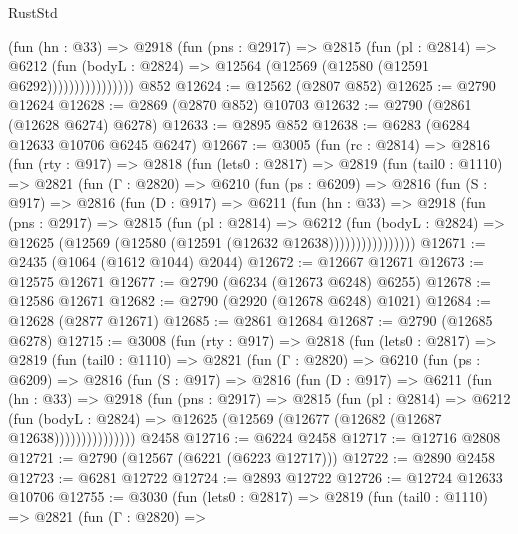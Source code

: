 \begin{lexlean}{RustStd}
\begin{coremodule}
{\begin{coremodule}
{{{{{{{{{{{{{{{{{{{{{{{{{{                      (fun (hn : @33) =>
                      @2918
                        (fun (pns : @2917) =>
                        @2815
                          (fun (pl : @2814) =>
                          @6212
                            (fun (bodyL : @2824) =>
                            @12564 (@12569 (@12580 (@12591 @6292))))))))))))))))
    @852
@12624 := @12562 (@2807 @852)
@12625 := @2790 @12624
@12628 := @2869 (@2870 @852) @10703
@12632 := @2790 (@2861 (@12628 @6274) @6278)
@12633 := @2895 @852
@12638 := @6283 (@6284 @12633 @10706 @6245 @6247)
@12667 := @3005
    (fun (rc : @2814) =>
    @2816
      (fun (rty : @917) =>
      @2818
        (fun (lets0 : @2817) =>
        @2819
          (fun (tail0 : @1110) =>
          @2821
            (fun (Γ : @2820) =>
            @6210
              (fun (ps : @6209) =>
              @2816
                (fun (S : @917) =>
                @2816
                  (fun (D : @917) =>
                  @6211
                    (fun (hn : @33) =>
                    @2918
                      (fun (pns : @2917) =>
                      @2815
                        (fun (pl : @2814) =>
                        @6212
                          (fun (bodyL : @2824) =>
                          @12625 (@12569 (@12580 (@12591 (@12632 @12638))))))))))))))))
@12671 := @2435 (@1064 (@1612 @1044) @2044)
@12672 := @12667 @12671
@12673 := @12575 @12671
@12677 := @2790 (@6234 (@12673 @6248) @6255)
@12678 := @12586 @12671
@12682 := @2790 (@2920 (@12678 @6248) @1021)
@12684 := @12628 (@2877 @12671)
@12685 := @2861 @12684
@12687 := @2790 (@12685 @6278)
@12715 := @3008
    (fun (rty : @917) =>
    @2818
      (fun (lets0 : @2817) =>
      @2819
        (fun (tail0 : @1110) =>
        @2821
          (fun (Γ : @2820) =>
          @6210
            (fun (ps : @6209) =>
            @2816
              (fun (S : @917) =>
              @2816
                (fun (D : @917) =>
                @6211
                  (fun (hn : @33) =>
                  @2918
                    (fun (pns : @2917) =>
                    @2815
                      (fun (pl : @2814) =>
                      @6212
                        (fun (bodyL : @2824) =>
                        @12625 (@12569 (@12677 (@12682 (@12687 @12638)))))))))))))))
    @2458
@12716 := @6224 @2458
@12717 := @12716 @2808
@12721 := @2790 (@12567 (@6221 (@6223 @12717)))
@12722 := @2890 @2458
@12723 := @6281 @12722
@12724 := @2893 @12722
@12726 := @12724 @12633 @10706
@12755 := @3030
    (fun (lets0 : @2817) =>
    @2819
      (fun (tail0 : @1110) =>
      @2821
        (fun (Γ : @2820) =>
}}}}}}}}}}}}}}}}}}}}}}}}}}
\end{coremodule}}
\end{coremodule}
\end{lexlean}
